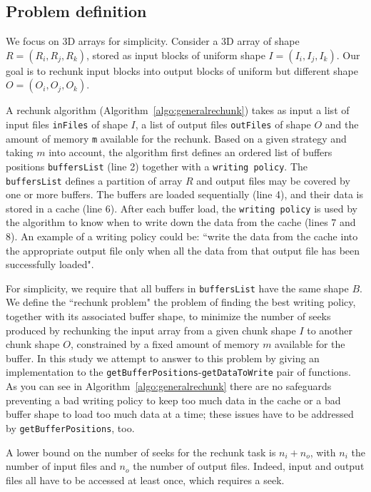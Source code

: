 \documentclass[conference]{IEEEtran}
\begin{document}
\subsection{Problem definition}
We focus on 3D arrays for simplicity. Consider a 3D array of shape $R =
(R_i, R_j, R_k)$, stored as input blocks of uniform shape $I =
(I_i, I_j, I_k)$. Our goal is to rechunk input blocks into output blocks of
uniform but different shape $O = (O_i, O_j, O_k)$.

A rechunk algorithm (Algorithm~\ref{algo:generalrechunk}) takes as input a
list of input files \texttt{inFiles} of shape $I$, a list of output files
\texttt{outFiles} of shape $O$ and the amount of memory \texttt{m}
available for the rechunk. Based on a given strategy and taking $m$ into
account, the algorithm first defines an ordered list of buffers positions
\texttt{buffersList} (line 2) together with a \texttt{writing policy}. The
\texttt{buffersList} defines a partition of array $R$ and output files
may be covered by one or more buffers. The buffers are loaded sequentially
(line 4), and their data is stored in a cache (line 6). After each buffer load,
the \texttt{writing policy} is used by the algorithm to know when to write down
the data from the cache (lines 7 and 8). An example of a writing policy could be:
``write the data from the cache into the appropriate output file only when all
the data from that output file has been successfully loaded".

For simplicity, we require that all buffers in \texttt{buffersList} have
the same shape $B$. We define the ``rechunk problem" the problem of finding the
best writing policy, together with its associated buffer shape, to minimize the
number of seeks produced by rechunking the input array from a given chunk shape
$I$ to another chunk shape $O$, constrained by a fixed amount of memory $m$
available for the buffer. In this study we attempt to answer to this problem by
giving an implementation to the \texttt{getBufferPositions}-\texttt{getDataToWrite}
pair of functions. As you can see in Algorithm~\ref{algo:generalrechunk} there
are no safeguards preventing a bad writing policy to keep too much data in the
cache or a bad buffer shape to load too much data at a time; these issues have
to be addressed by \texttt{getBufferPositions}, too.

A lower bound on the number of seeks for the rechunk task is
$n_i + n_o$, with $n_i$ the number of input files and $n_o$ the number of output
files. Indeed, input and output files all have to be accessed at least once,
which requires a seek.
\end{document}
